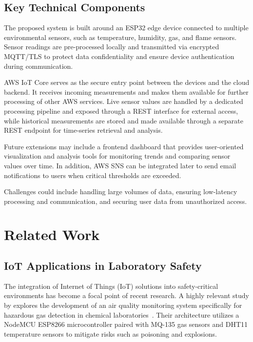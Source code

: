 \documentclass[conference,a4paper,flushend]{cs-techrep} %
\begin{document}
\subsection{Key Technical Components}\label{sec:key_technical_components}

The proposed system is built around an ESP32 edge device connected to multiple environmental sensors, such as temperature,
humidity, gas, and flame sensors. Sensor readings are pre-processed locally and transmitted via encrypted MQTT/TLS to protect
data confidentiality and ensure device authentication during communication.

AWS IoT Core serves as the secure entry point between the devices and the cloud backend. It receives incoming measurements and
makes them available for further processing of other AWS services. Live sensor values are handled by a dedicated processing
pipeline and exposed through a REST interface for external access, while historical measurements are stored and made available
through a separate REST endpoint for time-series retrieval and analysis.

Future extensions may include a frontend dashboard that provides user-oriented visualization and analysis tools for
monitoring trends and comparing sensor values over time. In addition, AWS SNS can be integrated later to send email notifications
to users when critical thresholds are exceeded.

Challenges could include handling large volumes of data, ensuring low-latency processing and communication, and
securing user data from unauthorized access.

\section{Related Work}\label{sec:related_work}

\subsection{IoT Applications in Laboratory Safety}\label{sec:iot_lab_safety}

The integration of Internet of Things (IoT) solutions into safety-critical environments has become a focal point of 
recent research. A highly relevant study by \citeauthor{Ramadhani2026} explores the 
development of an air quality monitoring system specifically for hazardous gas detection in chemical laboratories~\cite{Ramadhani2026}. 
Their architecture utilizes a NodeMCU ESP8266 microcontroller paired with MQ-135 gas sensors and DHT11 temperature 
sensors to mitigate risks such as poisoning and explosions.
\end{document}
